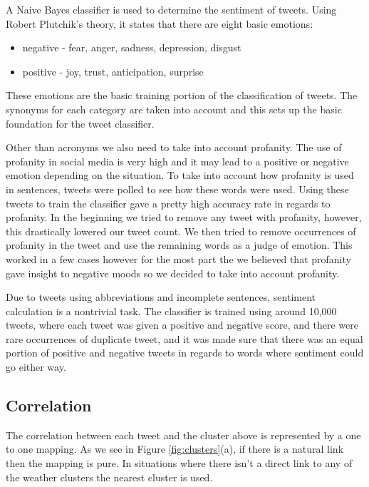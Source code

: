 \documentclass[journal]{vgtc}                %
\begin{document}
A Naive Bayes classifier is used to determine the sentiment of tweets.
Using Robert Plutchik's theory, it states that there are eight basic emotions: 
\begin{itemize}
\item negative - fear, anger, sadness, depression, disgust
\item positive - joy, trust, anticipation, surprise
\end{itemize}
    
These emotions are the basic training portion of the classification of tweets. The synonyms for each category are taken into account and this sets up the basic foundation for the tweet classifier. 

Other than acronyms we also need to take into account profanity. The use of profanity in social media is very high and it may lead to a positive or negative emotion depending on the situation. To take into account how profanity is used in sentences, tweets were polled to see how these words were used. Using these tweets to train the classifier gave a pretty high accuracy rate in regards to profanity. In the beginning we tried to remove any tweet with profanity, however, this drastically lowered our tweet count. We then tried to remove occurrences of profanity in the tweet and use the remaining words as a judge of emotion. This worked in a few cases however for the most part the we believed that profanity gave insight to negative moods so we decided to take into account profanity.

Due to tweets using abbreviations and incomplete sentences, sentiment calculation is a nontrivial task. The classifier is trained using around 10,000 tweets, where each tweet was given a positive and negative score, and there were rare occurrences of duplicate tweet, and it was made sure that there was an equal portion of positive and negative tweets in regards to words where sentiment could go either way. 


\subsection{Correlation}
\label{sec:corr}

The correlation between each tweet and the cluster above is represented by a one to one mapping. As we see in Figure \ref{fig:clusters}(a), if there is a natural link then the mapping is pure. In situations where there isn't a direct link to any of the weather clusters the nearest cluster is used.
\end{document}
